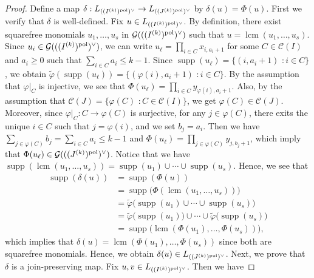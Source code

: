 \documentclass[12pt]{amsart}
\theoremstyle{definition}
\theoremstyle{remark}
\DeclareMathOperator{\supp}{supp}
\DeclareMathOperator{\lcm}{lcm}
\begin{document}
\begin{proof}
Define a map $\delta:L_{((I^{(k)})^{\rm pol})^{\vee}}\rightarrow L_{((J^{(k)})^{\rm pol})^{\vee}}$ by $\delta(u)=\Phi(u)$. First we verify that $\delta$ is well-defined. Fix $u\in L_{((I^{(k)})^{\rm pol})^{\vee}}$. By definition, there exist squarefree monomials $u_{1},\ldots,u_{s}$ in $\mathcal{G}(((I^{(k)})^{\rm pol})^{\vee})$ such that $u=\lcm(u_{1},\ldots, u_{s})$. Since $u_{i}\in \mathcal{G}(((I^{(k)})^{\rm pol})^{\vee})$, we can write $u_{\ell}=\prod_{i\in C}x_{i,a_{i}+1}$ for some $C\in\mathcal{C}(I)$ and $a_{i}\geq0$ such that $\sum_{i\in C}a_{i}\leq k-1$. Since $\supp(u_{\ell})=\{(i,a_{i}+1)\,\,: i\in C\}$, we obtain $\tilde{\varphi}(\supp(u_{\ell}))=\{(\varphi(i), a_{i}+1)\,\,: i\in C\}$. By the assumption that $\varphi|_{C}$ is injective, we see that $\Phi(u_{\ell})=\prod_{i\in C}y_{\varphi(i),a_{i}+1}$. Also, by the assumption that $\mathcal{C}(J)=\{\varphi(C)\,\,: C\in\mathcal{C}(I)\}$, we get $\varphi(C)\in\mathcal{C}(J)$. Moreover, since $\varphi|_{C}:C\rightarrow\varphi(C)$ is surjective, for any $j\in\varphi(C)$, there exits the unique $i\in C$ such that $j=\varphi(i)$, and we set $b_{j}=a_{i}$. Then we have $\sum_{j\in\varphi(C)}b_{j}=\sum_{i\in C}a_{i}\leq k-1$ and $\Phi(u_{\ell})=\prod_{j\in\varphi(C)}y_{j, b_{j}+1}$, which imply that $\Phi(u_{\ell})\in\mathcal{G}(((J^{(k)})^{\rm pol})^{\vee})$. 
Notice that we have $\supp(\lcm(u_{1},\ldots, u_{s}))=\supp(u_{1})\cup\cdots\cup\supp(u_{s})$. Hence, we see that 
\begin{align*}
\supp(\delta(u))&=\supp(\Phi(u)) \\
&=\supp\bigl(\Phi(\lcm(u_{1},\ldots,u_{s}))\bigr) \\
&=\tilde{\varphi}\bigl(
  \supp(u_{1})\cup\cdots\cup\supp(u_{s})
  \bigr) \\
&=\tilde{\varphi}\bigl(\supp(u_{1})\bigr)
  \cup\cdots\cup
  \tilde{\varphi}\bigl(\supp(u_{s})\bigr) \\
&=\supp\bigl(
  \lcm(\Phi(u_{1}),\ldots,\Phi(u_{s}))
  \bigr),
\end{align*}
which implies that $\delta(u)=\lcm(\Phi(u_{1}),\ldots,\Phi(u_{s}))$ since both are squarefree monomials. Hence, we obtain $\delta(u)\in L_{((J^{(k)})^{\rm pol})^{\vee}}$. 
Next, we prove that $\delta$ is a join-preserving map. Fix $u, v\in L_{((I^{(k)})^{\rm pol})^{\vee}}$. Then we have 

\end{proof}
\end{document}
